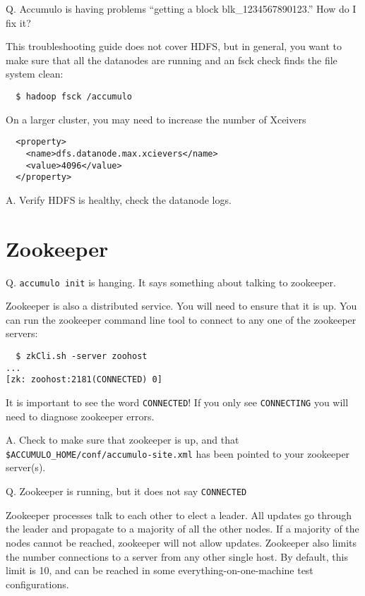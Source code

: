 Q. Accumulo is having problems ``getting a block blk\_1234567890123.'' How do I fix it?

This troubleshooting guide does not cover HDFS, but in general, you
want to make sure that all the datanodes are running and an fsck check
finds the file system clean:

\small
\begin{verbatim}
  $ hadoop fsck /accumulo
\end{verbatim}
\normalsize

On a larger cluster, you may need to increase the number of Xceivers

\small
\begin{verbatim}
  <property>
    <name>dfs.datanode.max.xcievers</name>
    <value>4096</value>
  </property>
\end{verbatim}
\normalsize

A. Verify HDFS is healthy, check the datanode logs.

\section{Zookeeper}

Q. \texttt{accumulo init} is hanging.  It says something about talking to zookeeper.

Zookeeper is also a distributed service.  You will need to ensure that
it is up.  You can run the zookeeper command line tool to connect to
any one of the zookeeper servers:

\small
\begin{verbatim}
  $ zkCli.sh -server zoohost
...
[zk: zoohost:2181(CONNECTED) 0] 
\end{verbatim}
\normalsize

It is important to see the word \texttt{CONNECTED}!  If you only see
\texttt{CONNECTING} you will need to diagnose zookeeper errors.

A. Check to make sure that zookeeper is up, and that
\texttt{\$ACCUMULO\_HOME/conf/accumulo-site.xml} has been pointed to
your zookeeper server(s).

Q. Zookeeper is running, but it does not say \texttt{CONNECTED}

Zookeeper processes talk to each other to elect a leader.  All updates
go through the leader and propagate to a majority of all the other
nodes.  If a majority of the nodes cannot be reached, zookeeper will
not allow updates.  Zookeeper also limits the number connections to a
server from any other single host.  By default, this limit is 10, and
can be reached in some everything-on-one-machine test configurations.

